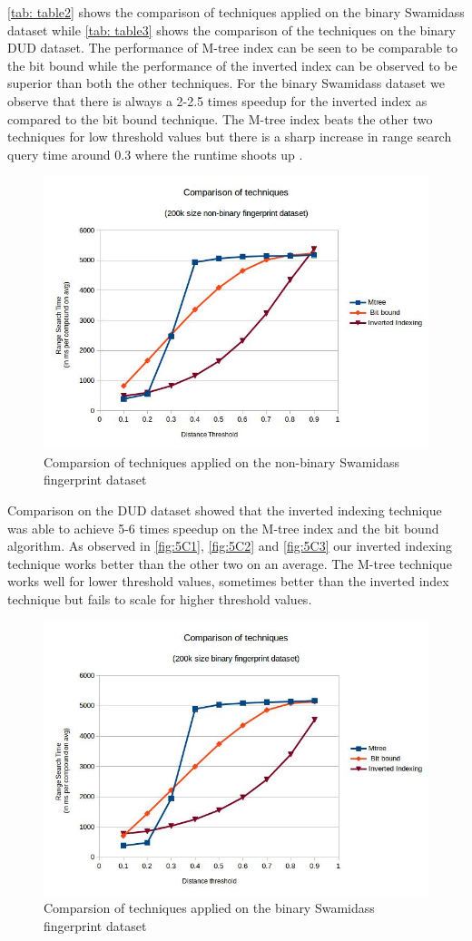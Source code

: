 \autoref{tab: table2} shows the comparison of techniques applied on the binary Swamidass dataset while \autoref{tab: table3} shows the comparison of the techniques on the binary DUD dataset. The performance of M-tree index can be seen to be comparable to the bit bound while the performance of the inverted index can be observed to be superior than both the other techniques. For the binary Swamidass dataset we observe  that there is always a 2-2.5 times speedup for the inverted index as compared to the bit bound technique. The M-tree index beats the other two techniques for low threshold values but there is a sharp increase in range search query time around 0.3 where the runtime shoots up .


\begin{figure}[ht!]	
\centering
\includegraphics[width=0.75 \columnwidth]{img/imageC1.jpg}
\caption{Comparsion of techniques applied on the non-binary Swamidass fingerprint dataset}
\label{fig:5C1}
\end{figure}


Comparison on the DUD dataset showed that the inverted indexing technique was able to achieve 5-6 times speedup on the M-tree index and the bit bound algorithm. As observed in \autoref{fig:5C1}, \autoref{fig:5C2} and \autoref{fig:5C3} our inverted indexing technique works better than the other two on an average. The M-tree technique works well for lower threshold values, sometimes better than the inverted index technique but fails to scale for higher threshold values. 



\begin{figure}[ht]	
\centering
\includegraphics[width=0.75 \columnwidth]{img/imageC2.jpg}
\caption{Comparsion of techniques applied on the binary Swamidass fingerprint dataset}
\label{fig:5C2}
\end{figure}

